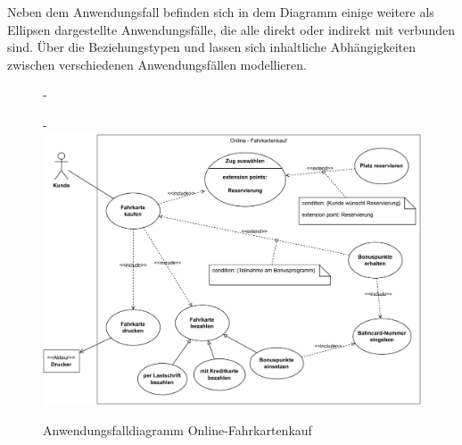 Neben dem Anwendungsfall  befinden sich in dem Diagramm einige weitere als Ellipsen dargestellte Anwendungsfälle, die alle direkt oder indirekt mit  verbunden sind. Über die Beziehungstypen  und  lassen sich inhaltliche Abhängigkeiten zwischen verschiedenen Anwendungsfällen modellieren.

\pagebreak %

\begin{figure}[h!]
	\begin{addmargin*}[0cm]{-\marginparwidth}
		\begin{addmargin*}[0cm]{-\marginparsep}
			\vspace{5mm} %
			\centering
			\includegraphics[scale=0.8]{Bilder/Kapitel-6/Fahrkartenautomat-online.pdf}
			\vspace{3mm} %
			\caption{Anwendungsfalldiagramm Online-Fahrkartenkauf}
			\label{fig:fahrkartenautomat_online}
		\end{addmargin*}
	\end{addmargin*}
\end{figure}

